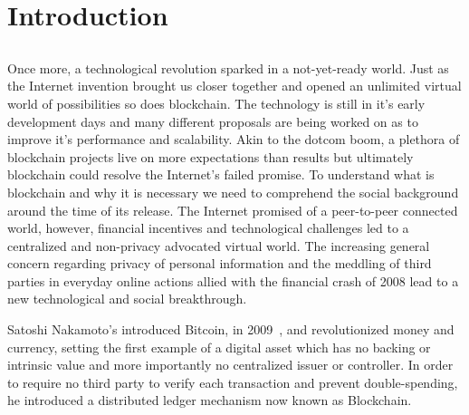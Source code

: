 \chapter{Introduction} \label{chap:intro}

\section*{}



Once more, a technological revolution sparked in a not-yet-ready world. Just as the Internet invention brought us closer together and opened an unlimited virtual world of possibilities so does blockchain. The technology is still in it's early development days and many different proposals are being worked on as to improve it's performance and scalability. Akin to the dotcom boom, a plethora of blockchain projects live on more expectations than results but ultimately blockchain could resolve the Internet's failed promise. To understand what is blockchain and why it is necessary we need to comprehend the social background around the time of its release. The Internet promised of a peer-to-peer connected world, however, financial incentives and technological challenges led to a centralized and non-privacy advocated virtual world. The increasing general concern regarding privacy of personal information and the meddling of third parties in everyday online actions allied with the financial crash of 2008 lead to a new technological and social breakthrough.

Satoshi Nakamoto's introduced Bitcoin, in 2009~\cite{Nakamoto2009Bitcoin:System}, and revolutionized money and currency, setting the first example of a digital asset which has no backing or intrinsic value and more importantly no centralized issuer or controller. In order to require no third party to verify each transaction and prevent double-spending, he introduced a distributed ledger mechanism now known as Blockchain.


